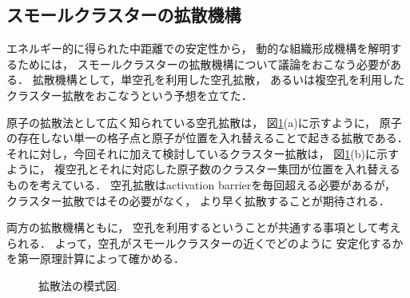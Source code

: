 \documentclass[a4j,twocolumn]{jsarticle}
\begin{document}
\vspace{-1.0\baselineskip}

\subsection{スモールクラスターの拡散機構}
エネルギー的に得られた中距離での安定性から，
動的な組織形成機構を解明するためには，
スモールクラスターの拡散機構について議論をおこなう必要がある．
拡散機構として，単空孔を利用した空孔拡散，
あるいは複空孔を利用したクラスター拡散をおこなうという予想を立てた．

原子の拡散法として広く知られている空孔拡散は，
図\ref{fig:four}(a)に示すように，
原子の存在しない単一の格子点と原子が位置を入れ替えることで起きる拡散である．
それに対し，今回それに加えて検討しているクラスター拡散は，
図\ref{fig:four}(b)に示すように，
複空孔とそれに対応した原子数のクラスター集団が位置を入れ替えるものを考えている．
空孔拡散はactivation barrierを毎回超える必要があるが，
クラスター拡散ではその必要がなく，
より早く拡散することが期待される．

両方の拡散機構ともに，
空孔を利用するということが共通する事項として考えられる．
よって，空孔がスモールクラスターの近くでどのように
安定化するかを第一原理計算によって確かめる．

\begin{figure}[htbp]
\begin{center}
    \caption{拡散法の模式図.}
    \label{fig:four}
\end{center}
\end{figure}
\end{document}
